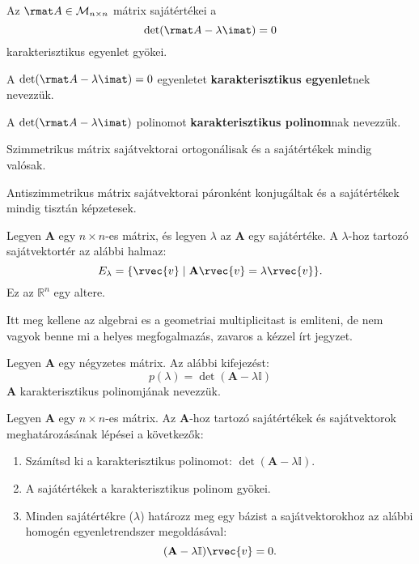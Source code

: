 \documentclass[a4paper, 12pt]{scrartcl}
\begin{document}
\begin{theorem}
  Az $\rmat A \in \mathcal M_{n \times n}$ mátrix sajátértékei a
  $$
    \det(\rmat A - \lambda \imat) = 0
  $$
  karakterisztikus egyenlet gyökei.
\end{theorem}

\begin{note}
  A $\det(\rmat A - \lambda \imat) = 0$ egyenletet \textbf{karakterisztikus
    egyenlet}nek nevezzük.

  A $\det(\rmat A - \lambda \imat)$ polinomot \textbf{karakterisztikus
    polinom}nak nevezzük.
\end{note}

\begin{note}
  Szimmetrikus mátrix sajátvektorai ortogonálisak és a sajátértékek mindig valósak.
\end{note}

\begin{note}
  Antiszimmetrikus mátrix sajátvektorai páronként konjugáltak és a sajátértékek mindig tisztán képzetesek.
\end{note}

\begin{definition}[Sajátaltér]
  Legyen \( \textbf{A} \) egy \( n \times n \)-es mátrix, és legyen \( \lambda \) az \( \textbf{A} \) egy sajátértéke. A \( \lambda \)-hoz tartozó sajátvektortér az alábbi halmaz:
  \[
    E_\lambda = \{ \rvec{v} \mid \textbf{A}\rvec{v} = \lambda\rvec{v} \}.
  \]
  Ez az \( \mathbb{R}^n \) egy altere.
\end{definition}

Itt meg kellene az algebrai es a geometriai multiplicitast is emliteni, de nem vagyok benne mi a helyes megfogalmazás, zavaros a kézzel írt jegyzet.

\begin{definition}
  Legyen \( \textbf{A} \) egy négyzetes mátrix. Az alábbi kifejezést:
  \[
    p(\lambda) = \det(\textbf{A} - \lambda \mathbb{I})
  \]
  \( \textbf{A} \) karakterisztikus polinomjának nevezzük.
\end{definition}

\begin{blueBox}
  Legyen \( \textbf{A} \) egy \( n \times n \)-es mátrix. Az \( \textbf{A} \)-hoz tartozó sajátértékek és sajátvektorok meghatározásának lépései a következők:
  \begin{enumerate}
    \item Számítsd ki a karakterisztikus polinomot: \( \det(\textbf{A} - \lambda \mathbb{I}) \).
    \item A sajátértékek a karakterisztikus polinom gyökei.
    \item Minden sajátértékre (\( \lambda \)) határozz meg egy bázist a sajátvektorokhoz az alábbi homogén egyenletrendszer megoldásával:
          \[
            (\textbf{A} - \lambda \mathbb{I})\rvec{v} = 0.
          \]
  \end{enumerate}
\end{blueBox}
\end{document}
